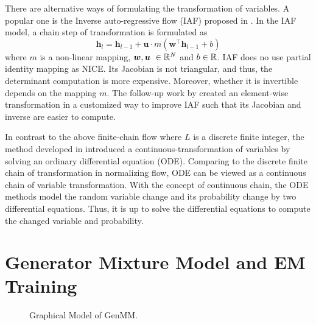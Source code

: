 \begin{remark}
  There are alternative ways of formulating the transformation of variables. A popular one is the Inverse auto-regressive flow (IAF) proposed in \cite{rezende2015variational}. In the IAF model, a chain step of transformation is formulated as
  \begin{equation*}
    \bm{h}_l = \bm{h}_{l-1} + \bm{u} \cdot {m}(\bm{w}^{\intercal} \bm{h}_{l-1} + b)
  \end{equation*}
  where $m$ is a non-linear mapping, $\bm{w}, \bm{u}~\in \mathbb{R}^{N}$ and $b\in \mathbb{R}$. IAF does no use partial identity mapping as NICE. Its Jacobian is not triangular, and thus, the determinant computation is more expensive. Moreover, whether it is invertible depends on the mapping $m$. The follow-up work by \cite{kingma2016IVF} created an element-wise transformation in a customized way to improve IAF such that its Jacobian and inverse are easier to compute. 
  
  In contrast to the above finite-chain flow where $L$ is a discrete finite integer, the method developed in \cite{ricky2018ODE} introduced a continuous-transformation of variables by solving an ordinary differential equation (ODE). Comparing to the discrete finite chain of transformation in normalizing flow, ODE can be viewed as a continuous chain of variable transformation. With the concept of continuous chain, the ODE methods model the random variable change and its probability change by two differential equations. Thus, it is up to solve the differential equations to compute the changed variable and probability.
\end{remark}

\section{Generator Mixture Model and EM Training}
\label{chpt6:sec:generator-mix-em}

\begin{figure}[t!]
  \centering
  \caption{Graphical Model of GenMM.}\label{chpt6:fig:genmm-graph}
\end{figure}


